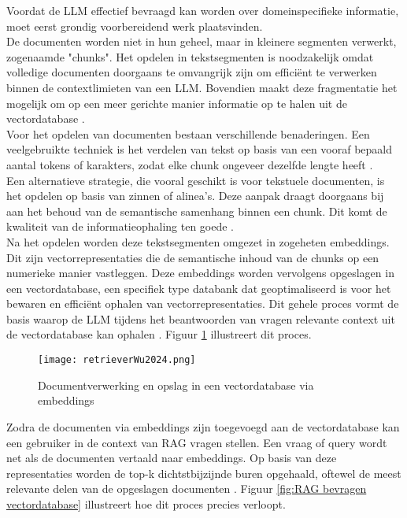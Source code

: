Voordat de LLM effectief bevraagd kan worden over domeinspecifieke informatie, moet eerst grondig voorbereidend werk plaatsvinden. 
\\[1em]
De documenten worden niet in hun geheel, maar in kleinere segmenten verwerkt, zogenaamde "chunks". Het opdelen in tekstsegmenten is noodzakelijk omdat volledige documenten doorgaans te omvangrijk zijn om efficiënt te verwerken binnen de contextlimieten van een LLM. Bovendien maakt deze fragmentatie het mogelijk om op een meer gerichte manier informatie op te halen uit de vectordatabase \autocite{wu2025retrievalaugmentedgenerationnaturallanguage}.
\\[1em]
Voor het opdelen van documenten bestaan verschillende benaderingen. Een veelgebruikte techniek is het verdelen van tekst op basis van een vooraf bepaald aantal tokens of karakters, zodat elke chunk ongeveer dezelfde lengte heeft \autocite{wang2024searchingbestpracticesretrievalaugmented}.
\\[1em]
Een alternatieve strategie, die vooral geschikt is voor tekstuele documenten, is het opdelen op basis van zinnen of alinea's. Deze aanpak draagt doorgaans bij aan het behoud van de semantische samenhang binnen een chunk. Dit komt de kwaliteit van de informatieophaling ten goede \autocite{wang2024searchingbestpracticesretrievalaugmented}.
\\[1em]
Na het opdelen worden deze tekstsegmenten omgezet in zogeheten embeddings. Dit zijn vectorrepresentaties die de semantische inhoud van de chunks op een numerieke manier vastleggen. Deze embeddings worden vervolgens opgeslagen in een vectordatabase, een specifiek type databank dat geoptimaliseerd is voor het bewaren en efficiënt ophalen van vectorrepresentaties. Dit gehele proces vormt de basis waarop de LLM tijdens het beantwoorden van vragen relevante context uit de vectordatabase kan ophalen \autocite{wu2025retrievalaugmentedgenerationnaturallanguage}. Figuur \ref{fig:RAG opmaken vectordatabase} illustreert dit proces.

 \begin{figure}[H]
    \centering
    \texttt{[image: retrieverWu2024.png]}
    \caption{Documentverwerking en opslag in een vectordatabase via embeddings \autocite{wu2025retrievalaugmentedgenerationnaturallanguage}}
    \label{fig:RAG opmaken vectordatabase}
\end{figure}

Zodra de documenten via embeddings zijn toegevoegd aan de vectordatabase kan een gebruiker in de context van RAG vragen stellen. Een vraag of query wordt net als de documenten vertaald naar embeddings. Op basis van deze representaties worden de top-k dichtstbijzijnde buren opgehaald, oftewel de meest relevante delen van de opgeslagen documenten \autocite{wu2025retrievalaugmentedgenerationnaturallanguage}. Figuur \ref{fig:RAG bevragen vectordatabase} illustreert hoe dit proces precies verloopt.
        
